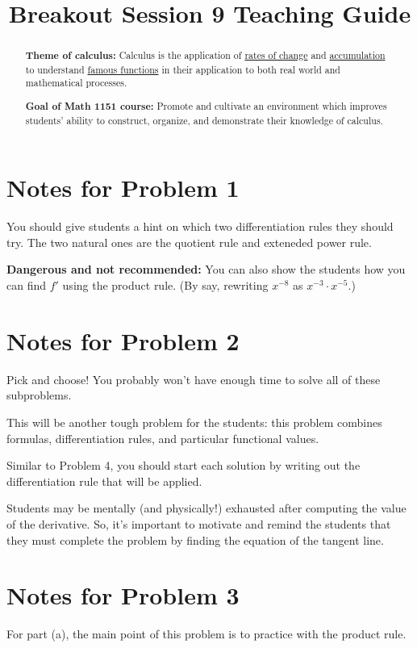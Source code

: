 \documentclass[handout,nooutcomes]{ximera}
\title{Breakout Session 9 Teaching Guide}
\begin{document}
\begin{abstract}
 \textbf{Theme of calculus:} Calculus is the application of  \href{https://en.wikipedia.org/wiki/Derivative}{rates of change} and \href{https://en.wikipedia.org/wiki/Integral}{accumulation} to understand \href{https://en.wikipedia.org/wiki/Elementary_function}{famous functions} in their application to both real world and mathematical processes.

  \textbf{Goal of Math 1151 course:} Promote and cultivate an environment which improves students' ability to construct, organize, and demonstrate their knowledge of calculus.

\end{abstract}
\maketitle

\section{Notes for Problem 1}
You should give students a hint on which two differentiation rules they should try.
The two natural ones are the quotient rule and exteneded power rule.

\textbf{Dangerous and not recommended:} You can also show the students how you can find $f'$ using the product rule.
(By say, rewriting $x^{-8}$ as $x^{-3} \cdot x^{-5}$.)

\section{Notes for Problem 2}
 Pick and choose!
 You probably won't have enough time to solve all of these subproblems.

    This will be another tough problem for the students: this problem combines formulas, differentiation rules, and particular functional values.

    Similar to Problem 4, you should start each solution by writing out the differentiation rule that will be applied.

    Students may be mentally (and physically!) exhausted after computing the value of the derivative.
    So, it's important to motivate and remind the students that they must complete the problem by finding the equation of the tangent line.

\section{Notes for Problem 3}
For part (a), the main point of this problem is to practice with the product rule.
\end{document}
